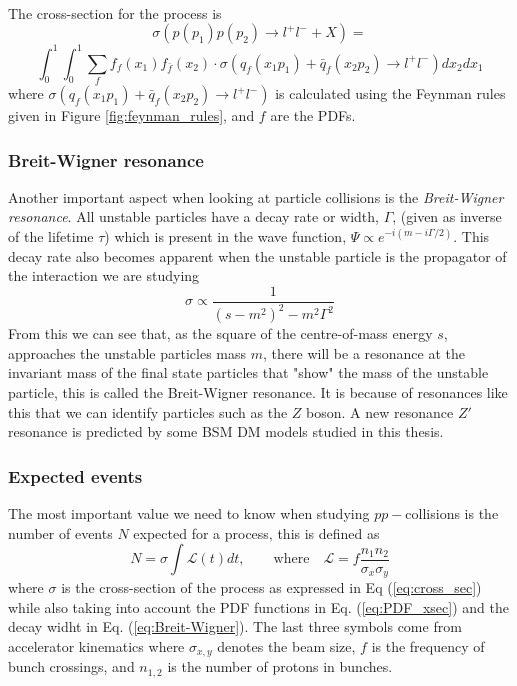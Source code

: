 \documentclass[12pt, a4paper]{book}
\begin{document}
\\The cross-section for the process is 
$$
\sigma\left(p(p_1) p(p_2)\rightarrow l^+l^- +X\right)=
$$
\begin{equation}\label{eq:PDF_xsec}
    \int_{0}^{1}\int_{0}^{1}\sum_{f}f_f(x_1)f_{\bar{f}}(x_2)\cdot\sigma\left(q_f(x_1p_1)+\bar{q}_f(x_2p_2)\rightarrow l^+l^- \right) dx_2dx_1
\end{equation}
where $\sigma\left(q_f(x_1p_1)+\bar{q}_f(x_2p_2)\rightarrow l^+l^- \right)$ is calculated using the Feynman rules given in Figure \ref{fig:feynman_rules}, and $f$ are the PDFs. %

\subsubsection{Breit-Wigner resonance}
Another important aspect when looking at particle collisions is the \textit{Breit-Wigner resonance}. All unstable particles have a decay rate or width, $\Gamma$, (given as inverse of the lifetime $\tau$) which is present in the wave function, 
$\Psi \propto e^{-i(m-i\Gamma/2)}$. This decay rate also becomes apparent when the unstable particle is the propagator of the interaction we are studying 
\begin{equation}\label{eq:Breit-Wigner}
    \sigma \propto\frac{1}{(s-m^2)^2-m^2\Gamma^2}
\end{equation}
From this we can see that, as the square of the centre-of-mass energy $s$, approaches the unstable particles mass $m$, there will be a resonance at the invariant mass of the final state particles that "show" the mass of the unstable particle, this is called the Breit-Wigner resonance. 
It is because of resonances like this that we can identify particles such as the $Z$ boson. A new resonance $Z'$ resonance is predicted by some BSM DM models studied in this thesis.\\


\subsubsection{Expected events}
The most important value we need to know when studying $pp-$collisions is the number of events $N$ expected for a process, this is defined as
\begin{equation}\label{eq:expected_events}
    N=\sigma\int\mathcal{L}(t)dt, \qquad\text{where}\quad \mathcal{L}=f\frac{n_1n_2}{\sigma_x\sigma_y}
\end{equation}
where $\sigma$ is the cross-section of the process as expressed in Eq (\ref{eq:cross_sec}) while also taking into account the PDF functions in Eq. (\ref{eq:PDF_xsec}) and the decay widht in Eq. (\ref{eq:Breit-Wigner}).
The last three symbols come from accelerator kinematics where $\sigma_{x,y}$ denotes the beam size, $f$ is the frequency of bunch crossings, and $n_{1,2}$ is the number of protons in bunches.
\end{document}
